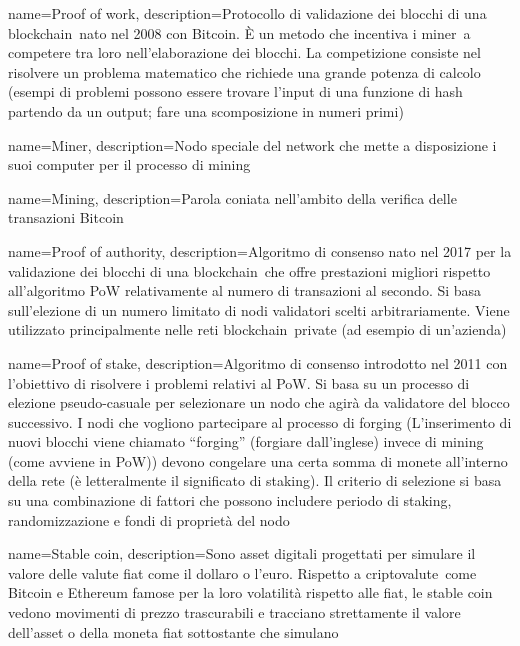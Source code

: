 {
	name={Proof of work},
	description={Protocollo di validazione dei blocchi di una blockchain\glo\ nato nel 2008 con Bitcoin. È un metodo che incentiva i miner\glo\ a competere tra loro nell’elaborazione dei blocchi. La competizione consiste nel risolvere un problema matematico che richiede una grande potenza di calcolo (esempi di problemi possono essere trovare l’input di una funzione di hash partendo da un output; fare una scomposizione in numeri primi)}
}

{
	name={Miner},
	description={Nodo speciale del network che mette a disposizione i suoi computer per il processo di mining\glo}
}

{
	name={Mining},
	description={Parola coniata nell’ambito della verifica delle transazioni Bitcoin}
}

{
	name={Proof of authority},
	description={Algoritmo di consenso nato nel 2017 per la validazione dei blocchi di una blockchain\glo\ che offre prestazioni migliori rispetto all’algoritmo PoW relativamente al numero di transazioni al secondo. Si basa sull’elezione di un numero limitato di nodi validatori scelti arbitrariamente. Viene utilizzato principalmente nelle reti blockchain\glo\ private (ad esempio di un’azienda)}
}

{
	name={Proof of stake},
	description={Algoritmo di consenso introdotto nel 2011 con l’obiettivo di risolvere i problemi relativi al PoW. Si basa su un processo di elezione pseudo-casuale per selezionare un nodo che agirà da validatore del blocco successivo.  I nodi che vogliono partecipare al processo di forging (L’inserimento di nuovi blocchi viene chiamato “forging” (forgiare dall’inglese) invece di mining (come avviene in PoW)) devono congelare una certa somma di monete all’interno della rete (è letteralmente il significato di staking). Il criterio di selezione si basa su una combinazione di fattori che possono includere periodo di staking, randomizzazione e fondi di proprietà del nodo}
}

{
	name={Stable coin},
	description={Sono asset digitali progettati per simulare il valore delle valute fiat come il dollaro o l'euro. Rispetto a criptovalute\glo\ come Bitcoin e Ethereum famose per la loro volatilità rispetto alle fiat, le stable coin vedono movimenti di prezzo trascurabili e tracciano strettamente il valore dell'asset o della moneta fiat sottostante che simulano}
}


